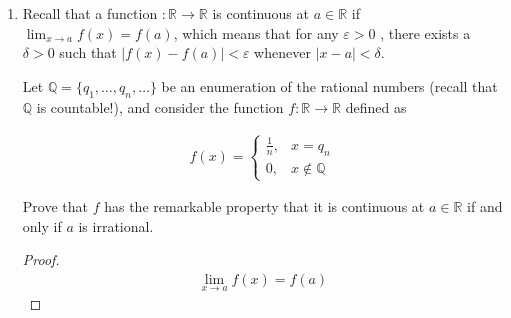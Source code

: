 \documentclass[12pt,a4paper,reqno,parskip=full]{amsart}
\numberwithin{equation}{section}
\theoremstyle{plain}
\theoremstyle{definition}
\begin{document}
\begin{enumerate}
\begin{itemize}
                $n = 3$
                \[
                  \frac{2}{7} + \frac{1}{70} =
                  \frac{21}{70} = \frac{3}{10}
                \]

                $n\in\mathbb{N}$
                \[\frac{n}{3n + 1}\]
          \item Use induction to prove that your conjecture is correct.
                \begin{proof}
                  Base step: \emph{See above}

                  Inductive step:
                  \begin{align*}
                    \frac{n - 1}{3n} + \frac{1}{(3n - 2)(3n + 1)} & = 3n \\
                    \frac{n - 1}{3n} + \frac{1}{9n^2 - 3n - 2}    & = 3n
                  \end{align*}
                \end{proof}
          \item Prove that the series converges, and find its sum.
        \end{itemize}
  \item Recall that a function $:\mathbb{R} \to\mathbb{R}$ is continuous at
        $a\in\mathbb{R}$ if $\displaystyle\lim_{x\to a}f(x)=f(a)$, which means
        that for any $\varepsilon>0$ , there exists a $\delta>0$ such
        that $|f(x)-f(a)|<\varepsilon$ whenever $|x-a|<\delta$.

        Let $\mathbb{Q} =\{q_1,\ldots,q_n,\ldots\}$ be an enumeration of the
        rational numbers (recall that $\mathbb{Q}$ is countable!), and consider
        the function $f:\mathbb{R} \to\mathbb{R}$ defined as

        \begin{align*}
          f(x)=
          \begin{cases}
            \frac{1}{n}, & x=q_n              \\
            0,           & x\not\in\mathbb{Q}
          \end{cases}
        \end{align*}

        Prove that $f$ has the remarkable property that it is continuous at
        $a\in\mathbb{R}$ if and only if $a$ is irrational.

        \begin{proof}
          \begin{align*}
            \lim_{x\to a}f(x) = f(a)
          \end{align*}
        \end{proof}
\end{enumerate}
\end{document}
